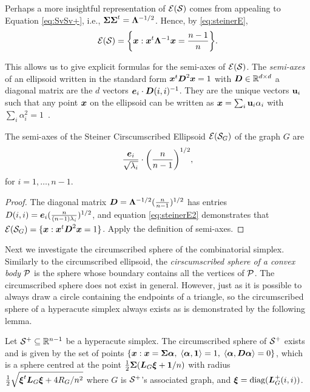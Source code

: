  Perhaps a more insightful representation of $\El(\splx)$ comes from appealing to Equation \eqref{eq:SvSv+}, i.e., $\Sv\Sv^\tp = \Eval^{-1/2}$. Hence, by \eqref{eq:steinerE},
\begin{equation}
\label{eq:steinerE2}
    \El(\splx) = \bigg\{\x:\x^\tp \Eval^{-1}\x = \frac{n-1}{n}\bigg\}.
\end{equation}

This allows us to give explicit formulas for the semi-axes of $\El(\splx)$.
 The \emph{semi-axes} of an ellipsoid written in the standard form $\x^\tp \D^2\x=1$ with $\D\in\R^{d\times d}$ a diagonal matrix are the $d$ vectors $\e_i\cdot \D(i,i)^{-1}$. They are the unique vectors $\u_i$ such that any  point $\x$ on the ellipsoid can be written as $\x=\sum_i \u_i\alpha_i$ with  $\sum_i\alpha_i^2=1$~\cite{devriendt2018simplex}. 
 
 \begin{lemma}
 	The semi-axes of the Steiner Cirscumscribed Ellipsoid  $\El(\splx_G)$ of  the graph $G$ are 
 	\[\frac{\e_i}{\sqrt{\lambda_i} }\cdot \bigg(\frac{n}{n-1}\bigg)^{1/2}, \]
 	for $i=1,\dots,n-1$. 
 \end{lemma}
\begin{proof}
	The diagonal matrix $\D=\Eval^{-1/2} (\frac{n}{n-1})^{1/2}$ has entries $D(i,i) = \e_i(\frac{n}{(n-1)\lambda_i})^{1/2}$, and equation  \eqref{eq:steinerE2} demonstrates  that  $\El(\splx_G) = \{\x:\x^\tp \D^2\x=1\}$. Apply the definition of semi-axes. 
\end{proof}

Next we investigate the circumscribed sphere of the combinatorial  simplex. Similarly to the circumscribed ellipsoid, the \emph{cirscumscribed sphere  of a convex body $\P$} is the sphere whose boundary contains all the vertices of $\P$. The circumscribed sphere does not exist in general. However, just as it is possible to always draw a circle containing the endpoints  of a triangle, so the circumscribed sphere of a hyperacute simplex always exists  as is demonstrated  by the following lemma.  

\begin{lemma}
	\label{lem:circ_sphere}
	Let $\splx^+\subset\R^{n-1}$ be a hyperacute simplex. The circumscribed sphere  of $\splx^+$ exists and is given by the set of points $\{\x:\x=\Sv\balpha, \; \la \balpha,\one \ra = 1, \; \la \balpha,\D\balpha\ra =0\}$, which is a sphere centred at the point $\frac{1}{2}\Sv(\L_G\bxi + \one/n)$ with radius $\frac{1}{2}\sqrt{\bxi^\tp\L_G\bxi + 4R_G/n^2}$ where $G$ is $\splx^+$'s associated graph, and $\bxi = \diag(\L_G^+(i,i))$. 
\end{lemma}

